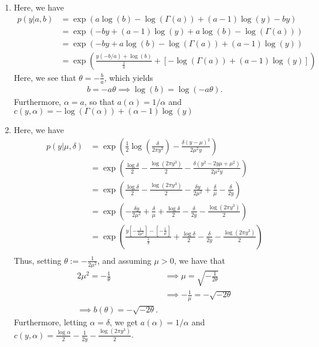 \documentclass[11pt]{article}
\newcommand*\ba{\[ \begin{aligned}}
\newcommand*\ea{\end{aligned} \]}
\renewcommand\;{\,}
\begin{document}
\begin{enumerate}[label=(\alph*)]
\begin{enumerate}[label=(\roman*)]
\item
Here, we have
\ba
p(y|a, b) & = \exp\left( a \log(b) - \log(\Gamma(a)) + (a - 1) \log(y) 
		- by \right) \\
	& = \exp\left( -by + (a - 1) \log(y) + a \log(b) - \log(\Gamma(a)) \right) \\
	& = \exp\left( -by + a\log(b) - \log(\Gamma(a)) + (a - 1)\log(y) \right) \\
	& = \exp\left( \frac{y(-b/a) + \log(b)}{\frac{1}{a}}
			+ \left[- \log(\Gamma(a)) + (a - 1)\log(y) \right] \right)
\ea 
Here, we see that $\theta = -\frac{b}{a}$,  which yields
\ba
b = -a\theta \implies \log(b) = \log(-a\theta).
\ea
Furthermore,
$\alpha = a$, so that $a(\alpha) = 1/\alpha$ and
$c(y, \alpha) = - \log(\Gamma(\alpha)) + (\alpha - 1)\log(y)$
\item
Here, we have
\ba
p(y|\mu, \delta) & = 
	\exp\left( \frac{1}{2} \log\left(\frac{\delta}{2\pi y^3}\right)
		- \frac{ \delta(y - \mu)^2 }{ 2\mu^2 y } \right) \\
	& = \exp\left( \frac{\log \delta}{2} - \frac{ \log(2\pi y^3) }{2}
		- \frac{\delta(y^2 - 2 y \mu + \mu^2)}{2\mu^2 y} \right) \\
	& = \exp\left( \frac{\log \delta}{2} - \frac{ \log(2\pi y^3) }{2}
		- \frac{\delta y}{2\mu^2} + \frac{\delta}{\mu}
		- \frac{\delta}{2y} \right) \\
	& = \exp\left( - \frac{\delta y}{2 \mu^2} + \frac{\delta}{\mu}
	 	+ \frac{\log \delta}{2} - \frac{\delta}{2y}
		 - \frac{\log(2\pi y^3)}{2} \right) \\
	& = \exp\left( \frac{ y \left[-\frac{1}{2\mu^2}\right] 
		- \left[-\frac{1}{\mu} \right] }
			{\frac{1}{\delta}} 
		+ \frac{\log \delta}{2} - \frac{\delta}{2y}
		 - \frac{\log(2\pi y^3)}{2} \right) \\
\ea
Thus, setting $\theta := -\frac{1}{2\mu^2}$, and assuming $\mu > 0$, we have that
\ba
2 \mu^2 = -\frac{1}{\theta} & \implies \mu = \sqrt{ - \frac{1}{2\theta} } \\
& \implies -\frac{1}{\mu} = - \sqrt{-2\theta} \\
\implies b(\theta) = - \sqrt{-2\theta}.
\ea
Furthermore, letting $\alpha = \delta$, we get
$a(\alpha) = 1/\alpha$ and 
$c(y, \alpha) = \frac{\log \alpha}{2} - \frac{1}{2y} - \frac{\log(2\pi y^3)}{2}$.
\end{enumerate}


\end{enumerate}
\end{document}
